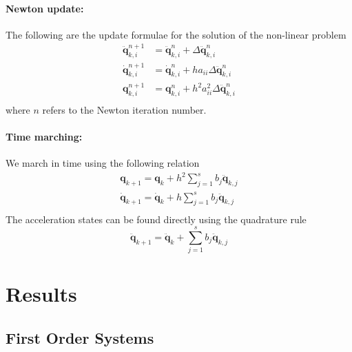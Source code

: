 \documentclass[pdftex,11pt,letter]{article}
\begin{document}
\begin{multicols}{2}
\paragraph{Newton update:}
The following are the update formulae for the solution of the non-linear problem
\begin{equation}\label{newton_update2}
  \begin{split}
    \mathbf{\ddot{q}}_{k,i}^{n+1} & = \mathbf{\ddot{q}}_{k,i}^{n} +
    \Delta\mathbf{\ddot{q}}_{k,i}^{n} \\
    \mathbf{\dot{q}}_{k,i}^{n+1} & = \mathbf{\dot{q}}_{k,i}^n + h a_{ii}
    \Delta\mathbf{\ddot{q}}_{k,i}^n \\
    \mathbf{{q}}_{k,i}^{n+1} & = \mathbf{{q}}_{k,i}^n + h^2 a_{ii}^2
    \Delta\mathbf{\ddot{q}}_{k,i}^n \\
  \end{split}
\end{equation}
where $n$ refers to the Newton iteration number.

\paragraph{Time marching:}
We march in time using the following relation
\begin{equation}
  \begin{split}
  \mathbf{q}_{k+1} = \mathbf{q}_{k} +h^2 \sum_{j=1}^s b_j \mathbf{\ddot{q}}_{k,j} \\
  \mathbf{\dot{q}}_{k+1} = \mathbf{\dot{q}}_{k} +h \sum_{j=1}^s b_j \mathbf{\ddot{q}}_{k,j} \\
  \end{split}
\end{equation}
The acceleration states can be found directly using the quadrature rule
\begin{equation}
  \mathbf{\ddot{q}}_{k+1} = \mathbf{\ddot{q}}_{k} + \sum_{j=1}^s b_j \mathbf{\ddot{q}}_{k,j}
\end{equation}



\section{Results}

\subsection{First Order Systems}


\end{multicols}
\end{document}
